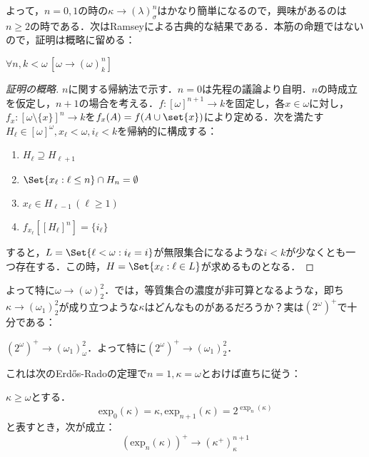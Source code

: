 \documentclass[a4j,lualatex,ja=standard]{bxjsarticle}
\newcommand{\Erdos}{Erd\H{o}s}
\begin{document}
よって，$n = 0, 1$の時の$\kappa \longrightarrow (\lambda)^n_\sigma$はかなり簡単になるので，興味があるのは$n \geq 2$の時である．次はRamseyによる古典的な結果である．本筋の命題ではないので，証明は概略に留める：
\begin{theorem}[Ramsey]
 $\forall n, k < \omega\, [\omega \longrightarrow (\omega)^n_k]$
\end{theorem}
\begin{proof}[証明の概略]
 $n$に関する帰納法で示す．$n = 0$は先程の議論より自明．$n$の時成立を仮定し，$n+1$の場合を考える．$f: [\omega]^{n+1} \rightarrow k$を固定し，各$x \in \omega$に対し，$f_x : [\omega \setminus \{x\}]^n \rightarrow k$を$f_x(A) = f(A \cup \set{x})$により定める．次を満たす$H_\ell \in [\omega]^\omega, x_\ell < \omega, i_\ell < k$を帰納的に構成する：
 \begin{enumerate}[label=(\alph*)]
  \item $H_\ell \supseteq H_{\ell+1}$
  \item $\Set{x_\ell : \ell \leq n} \cap H_{n} = \emptyset$
  \item $x_\ell \in H_{\ell - 1}\, (\ell \geq 1)$
  \item $f_{x_\ell}\left[[H_\ell]^n\right] = \{i_\ell\}$
 \end{enumerate}
 すると，$L = \Set{\ell < \omega : i_\ell = i}$が無限集合になるような$i < k$が少なくとも一つ存在する．この時，$H = \Set{x_\ell : \ell \in L}$が求めるものとなる．\mbox{}
\end{proof}

よって特に$\omega \longrightarrow (\omega)^2_2$．では，等質集合の濃度が非可算となるような，即ち$\kappa \longrightarrow (\omega_1)^2_2$が成り立つような$\kappa$はどんなものがあるだろうか？実は$(2^\omega)^+$で十分である：

\begin{theorem}
 $(2^\omega)^+ \longrightarrow (\omega_1)^2_\omega$．よって特に$(2^\omega)^+ \longrightarrow (\omega_1)^2_2$．
\end{theorem}

これは次のErd\H{o}s-Radoの定理で$n=1, \kappa = \omega$とおけば直ちに従う：

\begin{theorem}[一般化\Erdos-Rado]\label{Th:E-R}
 $\kappa \geq \omega$とする．
 \[
  \mathrm{exp}_0(\kappa) = \kappa, \mathrm{exp}_{n+1}(\kappa) = 2^{\exp_n(\kappa)}
 \]
 と表すとき，次が成立：
 \[
  (\mathrm{exp}_{n}(\kappa))^+ \longrightarrow (\kappa^+)^{n+1}_\kappa
 \]
\end{theorem}
\end{document}
